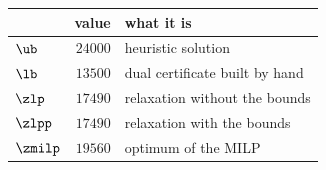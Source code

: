 \begin{center}\small
\begin{tabular}{lrl}
\toprule
 & value & what it is \\
\midrule
$\ub$ & $24000$ & heuristic solution \\
$\lb$ & $13500$ & dual certificate built by hand \\
$\zlp$ & $17490$ & relaxation without the bounds \\
$\zlpp$ & $17490$ & relaxation with the bounds \\
$\zmilp$ & $19560$ & optimum of the MILP \\
\bottomrule
\end{tabular}
\end{center}
